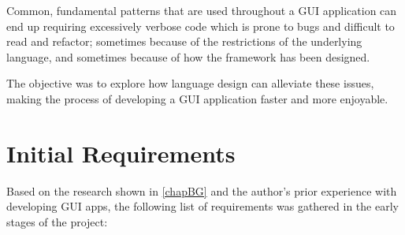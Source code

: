 \documentclass[11pt]{report}
\begin{document}
Common, fundamental patterns that are used throughout a GUI application can end up requiring excessively verbose code which is prone to bugs and difficult to read and refactor; sometimes because of the restrictions of the underlying language, and sometimes because of how the framework has been designed.

The objective was to explore how language design can alleviate these issues, making the process of developing a GUI application faster and more enjoyable.

\section{Initial Requirements} \label{secRequirements}

Based on the research shown in \cref{chapBG} and the author's prior experience with developing GUI apps, the following list of requirements was gathered in the early stages of the project:
\end{document}
